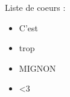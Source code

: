 \documentclass[a4paper]{article}
\begin{document}
    Liste de coeurs :
\begin{itemize}[label= \Large,font=\color{magenta},parsep=0cm,itemsep=0cm]
        \item C'est
        \item trop
        \item MIGNON
	\item <3
    \end{itemize}
\end{document}

